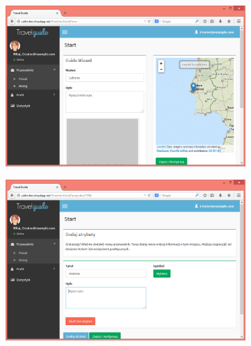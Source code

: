 \documentclass{book}
\begin{document}
		\begin{figure}[H]
			\ContinuedFloat
			
			\begin{subfigure}{1\textwidth}
				\includegraphics[width=\textwidth]{screenshots/web/3dodawanie.png}					
				\caption{\label{subfig:web_add}	}
			\end{subfigure}
			\hfill			
			\begin{subfigure}{1\textwidth}
				\includegraphics[width=\textwidth]{screenshots/web/4dodawanie2.png}					
				\caption{\label{subfig:web_add2}}
			\end{subfigure}
			
		\end{figure}
\end{document}
